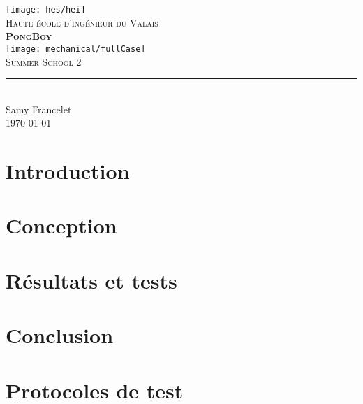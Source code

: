 \documentclass[11pt,titlepage]{report}
\begin{document}
\begin{titlepage}
	\centering
    \texttt{[image: hes/hei]}\\[1cm] 	%
    \textsc{\LARGE Haute école d'ingénieur du Valais}\\ \vspace{\fill}
    \textbf{\textsc{\fontsize{35}{35}\selectfont PongBoy}}\\ \vspace{\fill}
		\texttt{[image: mechanical/fullCase]}\\[2cm]
	\textsc{\LARGE Summer School 2}\\[0.4cm]
	\rule{\linewidth}{0.2 mm} \\[0.5 cm]
	Samy Francelet \\
	\today
\end{titlepage}
\restoregeometry

\tableofcontents

\chapter{Introduction}


\chapter{Conception}


\chapter{Résultats et tests}


%

\chapter{Conclusion}


\appendix
\chapter{Protocoles de test}

\end{document}

